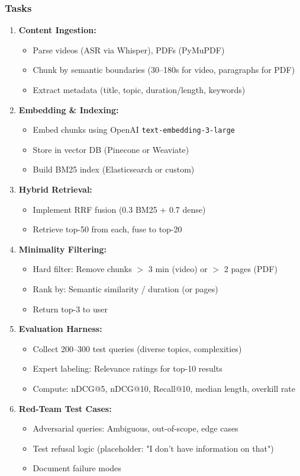 \documentclass[11pt,letterpaper]{article}
\begin{document}
\subsubsection{Tasks}\label{subsubsec:m1-tasks}
\begin{enumerate}
\item \textbf{Content Ingestion:}
\begin{itemize}
\item Parse videos (ASR via Whisper), PDFs (PyMuPDF)
\item Chunk by semantic boundaries (30--180s for video, paragraphs for PDF)
\item Extract metadata (title, topic, duration/length, keywords)
\end{itemize}

\item \textbf{Embedding \& Indexing:}
\begin{itemize}
\item Embed chunks using OpenAI \texttt{text-embedding-3-large}
\item Store in vector DB (Pinecone or Weaviate)
\item Build BM25 index (Elasticsearch or custom)
\end{itemize}

\item \textbf{Hybrid Retrieval:}
\begin{itemize}
\item Implement RRF fusion (0.3 BM25 + 0.7 dense)
\item Retrieve top-50 from each, fuse to top-20
\end{itemize}

\item \textbf{Minimality Filtering:}
\begin{itemize}
\item Hard filter: Remove chunks $>$ 3 min (video) or $>$ 2 pages (PDF)
\item Rank by: Semantic similarity / duration (or pages)
\item Return top-3 to user
\end{itemize}

\item \textbf{Evaluation Harness:}
\begin{itemize}
\item Collect 200--300 test queries (diverse topics, complexities)
\item Expert labeling: Relevance ratings for top-10 results
\item Compute: nDCG@5, nDCG@10, Recall@10, median length, overkill rate
\end{itemize}

\item \textbf{Red-Team Test Cases:}
\begin{itemize}
\item Adversarial queries: Ambiguous, out-of-scope, edge cases
\item Test refusal logic (placeholder: "I don't have information on that")
\item Document failure modes
\end{itemize}
\end{enumerate}
\end{document}
